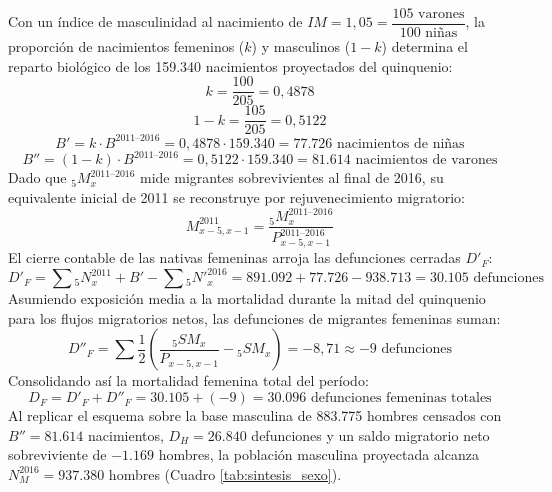 \documentclass[12pt,letterpaper]{article}
\begin{document}
Con un índice de masculinidad al nacimiento de $IM = 1{,}05 = \dfrac{105\text{ varones}}{100\text{ niñas}}$, la proporción de nacimientos femeninos ($k$) y masculinos ($1-k$) determina el reparto biológico de los 159.340 nacimientos proyectados del quinquenio:
\begin{equation}
k = \dfrac{100}{205} = 0{,}4878
\end{equation}
\begin{equation}
1 - k = \dfrac{105}{205} = 0{,}5122
\end{equation}
\begin{equation}
B' = k \cdot B^{2011\text{--}2016} = 0{,}4878 \cdot 159.340 = 77.726\text{ nacimientos de niñas}
\end{equation}
\begin{equation}
B'' = (1 - k) \cdot B^{2011\text{--}2016} = 0{,}5122 \cdot 159.340 = 81.614\text{ nacimientos de varones}
\end{equation}
Dado que ${}_{5}M_x^{2011\text{--}2016}$ mide migrantes sobrevivientes al final de 2016, su equivalente inicial de 2011 se reconstruye por rejuvenecimiento migratorio:
\begin{equation}
M^{2011}_{x-5,x-1} = \dfrac{{}_{5}M_x^{2011\text{--}2016}}{P^{2011\text{--}2016}_{x-5,x-1}}
\end{equation}
El cierre contable de las nativas femeninas arroja las defunciones cerradas $D'_F$:
\begin{equation}
D'_F = \sum {}_{5}N^{2011}_x + B' - \sum {}_{5}N'^{2016}_x = 891.092 + 77.726 - 938.713 = 30.105\text{ defunciones}
\end{equation}
Asumiendo exposición media a la mortalidad durante la mitad del quinquenio para los flujos migratorios netos, las defunciones de migrantes femeninas suman:
\begin{equation}
D''_F = \sum \dfrac{1}{2} \left( \dfrac{{}_{5}SM_x}{P_{x-5,x-1}} - {}_{5}SM_x \right) = -8{,}71 \approx -9\text{ defunciones}
\end{equation}
Consolidando así la mortalidad femenina total del período:
\begin{equation}
D_F = D'_F + D''_F = 30.105 + (-9) = 30.096\text{ defunciones femeninas totales}
\end{equation}
Al replicar el esquema sobre la base masculina de 883.775 hombres censados con $B'' = 81.614$ nacimientos, $D_H = 26.840$ defunciones y un saldo migratorio neto sobreviviente de $-1.169$ hombres, la población masculina proyectada alcanza $N_M^{2016} = 937.380$ hombres (Cuadro \ref{tab:sintesis_sexo}).
\end{document}
